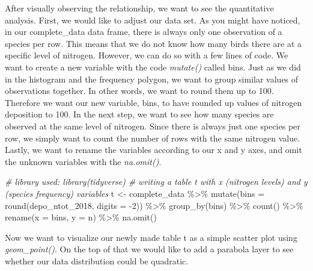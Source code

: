 \documentclass[
]{article}
\newenvironment{Shaded}{\begin{snugshade}}{\end{snugshade}}
\newcommand{\AttributeTok}[1]{\textcolor[rgb]{0.77,0.63,0.00}{#1}}
\newcommand{\CommentTok}[1]{\textcolor[rgb]{0.56,0.35,0.01}{\textit{#1}}}
\newcommand{\DecValTok}[1]{\textcolor[rgb]{0.00,0.00,0.81}{#1}}
\newcommand{\FunctionTok}[1]{\textcolor[rgb]{0.00,0.00,0.00}{#1}}
\newcommand{\NormalTok}[1]{#1}
\newcommand{\OtherTok}[1]{\textcolor[rgb]{0.56,0.35,0.01}{#1}}
\newcommand{\SpecialCharTok}[1]{\textcolor[rgb]{0.00,0.00,0.00}{#1}}
\begin{document}
After visually observing the relationship, we want to see the
quantitative analysis. First, we would like to adjust our data set. As
you might have noticed, in our complete\_data data frame, there is
always only one observation of a species per row. This means that we do
not know how many birds there are at a specific level of nitrogen.
However, we can do so with a few lines of code. We want to create a new
variable with the code \emph{mutate()} called bins. Just as we did in
the histogram and the frequency polygon, we want to group similar values
of observations together. In other words, we want to round them up to
100. Therefore we want our new variable, bins, to have rounded up values
of nitrogen deposition to 100. In the next step, we want to see how many
species are observed at the same level of nitrogen. Since there is
always just one species per row, we simply want to count the number of
rows with the same nitrogen value. Lastly, we want to rename the
variables according to our x and y axes, and omit the unknown variables
with the \emph{na.omit()}.

\begin{Shaded}
\begin{Highlighting}[]
\CommentTok{\# library used: library(tidyverse)}
\CommentTok{\# writing a table t with x (nitrogen levels) and y (species frequency) variables}
\NormalTok{t }\OtherTok{\textless{}{-}}\NormalTok{ complete\_data }\SpecialCharTok{\%\textgreater{}\%} 
  \FunctionTok{mutate}\NormalTok{(}\AttributeTok{bins =} \FunctionTok{round}\NormalTok{(depo\_ntot\_2018, }\AttributeTok{digits =} \SpecialCharTok{{-}}\DecValTok{2}\NormalTok{)) }\SpecialCharTok{\%\textgreater{}\%} 
  \FunctionTok{group\_by}\NormalTok{(bins) }\SpecialCharTok{\%\textgreater{}\%} 
  \FunctionTok{count}\NormalTok{() }\SpecialCharTok{\%\textgreater{}\%} 
  \FunctionTok{rename}\NormalTok{(}\AttributeTok{x =}\NormalTok{ bins,}
         \AttributeTok{y =}\NormalTok{ n) }\SpecialCharTok{\%\textgreater{}\%} 
  \FunctionTok{na.omit}\NormalTok{()}
\end{Highlighting}
\end{Shaded}

Now we want to visualize our newly made table t as a simple scatter plot
using \emph{geom\_point()}. On the top of that we would like to add a
parabola layer to see whether our data distribution could be quadratic.
\end{document}
